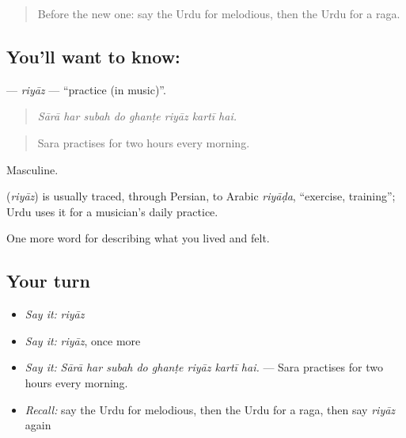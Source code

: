 \label{lesson:UR-C518-riyaz}



\begin{quote}
Before the new one: say the Urdu for melodious, then the Urdu for a raga.
\end{quote}

\subsection*{You'll want to know: }
\textbf{} — \emph{riyāz} — \textquotedblleft{}practice (in music)\textquotedblright{}.

\begin{quote}
       
\end{quote}

\begin{quote}
\emph{Sārā har subah do ghanṭe riyāz kartī hai.}
\end{quote}

\begin{quote}
Sara practises for two hours every morning.
\end{quote}

Masculine.

\begin{cousinweb}
\textbf{} (\emph{riyāz}) is usually traced, through Persian, to Arabic \emph{riyāḍa}, \textquotedblleft{}exercise, training\textquotedblright{}; Urdu uses it for a musician's daily practice.
\end{cousinweb}

\begin{grammarlens}[title={What you've built}]
One more word for describing what you lived and felt.
\end{grammarlens}

\subsection*{Your turn}
\begin{itemize}
\raggedright
  \item \emph{Say it:} \emph{riyāz}
  \item \emph{Say it:} \emph{riyāz}, once more
  \item \emph{Say it:} \emph{Sārā har subah do ghanṭe riyāz kartī hai.} — Sara practises for two hours every morning.
  \item \emph{Recall:} say the Urdu for melodious, then the Urdu for a raga, then say \emph{riyāz} again
\end{itemize}

